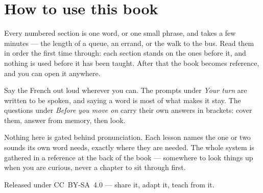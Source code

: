 \documentclass[11pt,twoside]{book}
\begin{document}
\section*{How to use this book}

Every numbered section is one word, or one small phrase, and takes a few
minutes --- the length of a queue, an errand, or the walk to the bus. Read them
in order the first time through: each section stands on the ones before it, and
nothing is used before it has been taught. After that the book becomes
reference, and you can open it anywhere.

Say the French out loud wherever you can. The prompts under \emph{Your turn}
are written to be spoken, and saying a word is most of what makes it stay. The
questions under \emph{Before you move on} carry their own answers in brackets:
cover them, answer from memory, then look.

Nothing here is gated behind pronunciation. Each lesson names the one or two
sounds its own word needs, exactly where they are needed. The whole system is
gathered in a reference at the back of the book --- somewhere to look things up
when you are curious, never a chapter to sit through first.

Released under CC~BY-SA~4.0 --- share it, adapt it, teach from it.

\tableofcontents

\mainmatter


\end{document}
